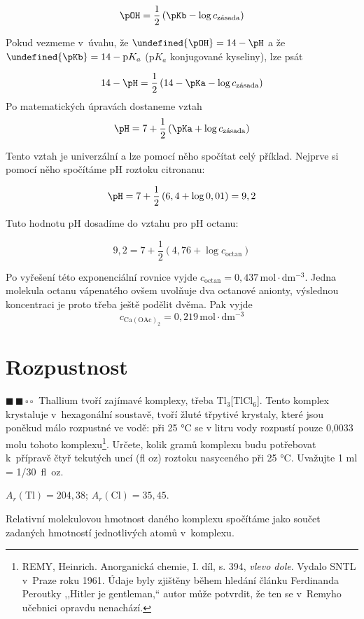 \documentclass{book}
\let\ch\undefined
\newcommand{\dva}{$\blacksquare \, \blacksquare \, \square \, \square \; \; $}
\renewenvironment{quotation}{\par}{\par} %
\begin{document}
\[
\pOH=\frac{1}{2}\left(\pKb-\log c_{\mathrm{z\acute{a}sada}}\right)
\]

Pokud vezmeme v~úvahu, že $\ch{\pOH}=14-\pH$ a že $\ch{\pKb}=14-\mathrm{p}K_{a}$
($\mathrm{p}K_{a}$ konjugované kyseliny), lze psát

\[
14-\pH=\frac{1}{2}\left(14-\pKa-\log c_{\mathrm{z\acute{a}sada}}\right)
\]
Po matematických úpravách dostaneme vztah
\[
\pH=7+\frac{1}{2}\left(\pKa+\log c_{\mathrm{z\acute{a}sada}}\right)
\]

Tento vztah je univerzální a lze pomocí něho spočítat celý příklad.
Nejprve si pomocí něho spočítáme pH roztoku citronanu: 

\[
\pH=7+\frac{1}{2}\left(6,4+\log0,01\right)=9,2
\]

\newpage %
Tuto hodnotu pH dosadíme do vztahu pro pH octanu: 

\[
\mathrm{9,2}=7+\frac{1}{2}\left(4,76+\log c_{\mathrm{octan}}\right)
\]

Po vyřešení této exponenciální rovnice vyjde $c_{\mathrm{ octan}}=0,437\,\mathrm{mol\cdot dm^{-3}}$.
Jedna molekula octanu vápenatého ovšem uvolňuje dva octanové anionty,
výslednou koncentraci je proto třeba ještě podělit dvěma. Pak vyjde
\[
c_{\mathrm{Ca(OAc)_{2}}}=0,219\,\mathrm{mol\cdot dm^{-3}}
\]



\section{Rozpustnost}

\begin{quotation}
\dva Thallium tvoří zajímavé komplexy, třeba Tl$_{3}${[}TlCl$_{6}${]}.
Tento komplex krystaluje v~hexagonální soustavě, tvoří žluté třpytivé
krystaly, které jsou poněkud málo rozpustné ve vodě: při 25 °C se
v litru vody rozpustí pouze 0,0033 molu tohoto komplexu\footnote{REMY, Heinrich. Anorganická chemie, I. díl, s. 394, \textit{vlevo
dole}. Vydalo SNTL v~Praze roku 1961. Údaje byly zjištěny během hledání
článku Ferdinanda Peroutky ,,Hitler je gentleman,`` autor může potvrdit,
že ten se v~Remyho učebnici opravdu nenachází.}. Určete, kolik gramů komplexu budu potřebovat k~přípravě čtyř tekutých
uncí (fl oz) roztoku nasyceného při 25 °C. Uvažujte 1 ml = 1/30~fl~oz.

$A_{r}(\mathrm{Tl})=204,38$; $A_{r}(\mathrm{Cl})=35,45$.
\end{quotation} \dotfill \par 
Relativní molekulovou hmotnost daného komplexu spočítáme jako součet
zadaných hmotností jednotlivých atomů v~komplexu.
\end{document}
